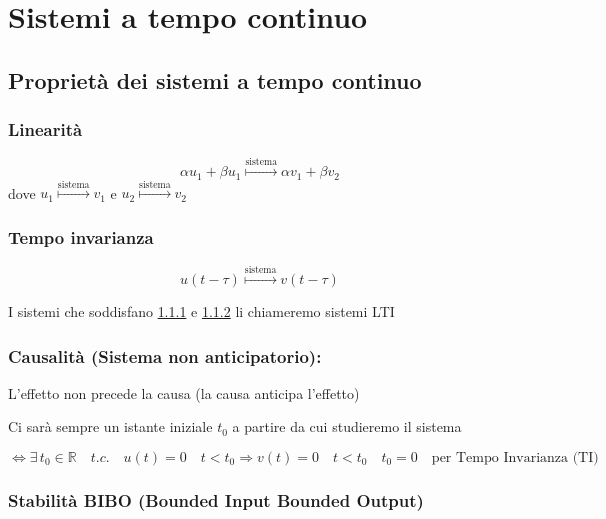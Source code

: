 \chapter{Sistemi a tempo continuo}


\section{Proprietà dei sistemi a tempo continuo}
\subsection{Linearità}\label{sist_prop_Lin}  
	\[
	\alpha u_1+\beta u_1 \overset{\text{sistema}}{\longmapsto} \alpha v_1+\beta v_2
	\]
	dove $ u_1 \overset{\text{sistema}}{\longmapsto} v_1$ e $u_2\overset{\text{sistema}}{\longmapsto} v_2$
	
\subsection{Tempo invarianza} \label{sist_prop_TIn}
	\[
	u(t-\tau) \overset{\text{sistema}}{\longmapsto} v(t-\tau)
	\]
	
	\begin{definizione}
		I sistemi che soddisfano \ref{sist_prop_Lin} e \ref{sist_prop_TIn} li chiameremo sistemi LTI
	\end{definizione}

 \subsection{Causalità (Sistema non anticipatorio):} \label{sist_prop_cau}
	
	L'effetto non precede la causa (la causa anticipa l'effetto)
	
	\begin{osservazione}
		Ci sarà sempre un istante iniziale $t_0$ a partire da cui studieremo il sistema
	\end{osservazione}
	\[
		\Leftrightarrow \exists \,t_0 \in \mathbb{R} \quad t.c. \quad u(t)=0 \quad t<t_0
		\Rightarrow v(t)=0 \quad t<t_0
		\quad t_0 =0 \quad \text{per Tempo Invarianza (TI)}
	\]
\subsection{Stabilità BIBO (Bounded Input Bounded Output)}\label{sist_prop_BIBOstab}
	
